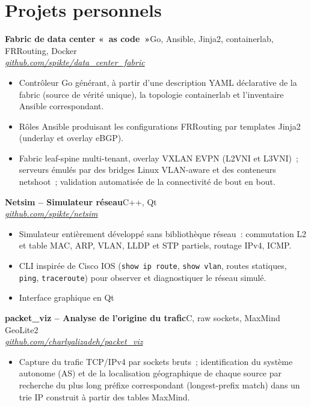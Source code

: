 \documentclass[9pt,a4paper]{extarticle}
\newcommand{\entry}[4]{%
  \textbf{#1}\hfill #2\\[-0.1em]
  \textit{#3}\hfill \textit{#4}\par\vspace{0.1em}}
\begin{document}
\section{Projets personnels}

\entry{Fabric de data center «~as code~»}{Go, Ansible, Jinja2, containerlab, FRRouting, Docker}{}{\href{https://github.com/spikte/data_center_fabric}{github.com/spikte/data\_center\_fabric}}
\begin{itemize}
  \item Contrôleur Go générant, à partir d'une description YAML déclarative de la fabric (source de vérité unique),
        la topologie containerlab et l'inventaire Ansible correspondant.
  \item Rôles Ansible produisant les configurations FRRouting par templates Jinja2 (underlay et overlay eBGP).
  \item Fabric leaf-spine multi-tenant, overlay VXLAN EVPN (L2VNI et L3VNI)~; serveurs émulés par des bridges
        Linux VLAN-aware et des conteneurs netshoot~; validation automatisée de la connectivité de bout en bout.
\end{itemize}


\entry{Netsim -- Simulateur réseau}{C++, Qt}{}{\href{https://github.com/spikte/netsim}{github.com/spikte/netsim}}
\begin{itemize}
  \item Simulateur entièrement développé sans bibliothèque réseau~: commutation L2 et table MAC, ARP, VLAN,
        LLDP et STP partiels, routage IPv4, ICMP.
  \item CLI inspirée de Cisco IOS (\texttt{show ip route}, \texttt{show vlan}, routes statiques, \texttt{ping},
        \texttt{traceroute}) pour observer et diagnostiquer le réseau simulé.
  \item Interface graphique en Qt
\end{itemize}


\entry{packet\_viz -- Analyse de l'origine du trafic}{C, raw sockets, MaxMind GeoLite2}{}{\href{https://github.com/charlyalizadeh/packet_viz}{github.com/charlyalizadeh/packet\_viz}}
\begin{itemize}
  \item Capture du trafic TCP/IPv4 par sockets bruts~; identification du système autonome (AS) et de la localisation géographique de chaque source par recherche
        du plus long préfixe correspondant (longest-prefix match) dans un trie IP construit à partir des tables MaxMind.
\end{itemize}
\end{document}

